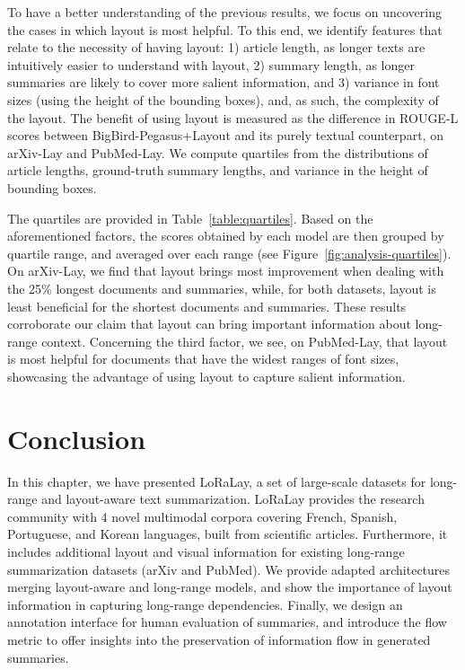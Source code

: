 To have a better understanding of the previous results, we focus on uncovering the cases in which layout is most helpful. To this end, we identify features that relate to the necessity of having layout: 1) article length, as longer texts are intuitively easier to understand with layout, 2) summary length, as longer summaries are likely to cover more salient information, and 3) variance in font sizes (using the height of the bounding boxes), and, as such, the complexity of the layout.
The benefit of using layout is measured as the difference in ROUGE-L scores between BigBird-Pegasus+Layout and its purely textual counterpart, on arXiv-Lay and PubMed-Lay. We compute quartiles from the distributions of article lengths, ground-truth summary lengths, and variance in the height of bounding boxes. 

The quartiles are provided in Table~\ref{table:quartiles}. Based on the aforementioned factors, the scores obtained by each model are then grouped by quartile range, and averaged over each range (see Figure~\ref{fig:analysis-quartiles}). On arXiv-Lay, we find that layout brings most improvement when dealing with the 25\% longest documents and summaries, while, for both datasets, layout is least beneficial for the shortest documents and summaries. These results corroborate our claim that layout can bring important information about long-range context. Concerning the third factor, we see, on PubMed-Lay, that layout is most helpful for documents that have the widest ranges of font sizes, showcasing the advantage of using layout to capture salient information. 

\section{Conclusion}

In this chapter, we have presented LoRaLay, a set of large-scale datasets for long-range and layout-aware text summarization. LoRaLay provides the research community with 4 novel multimodal corpora covering French, Spanish, Portuguese, and Korean languages, built from scientific articles. Furthermore, it includes additional layout and visual information for existing long-range summarization datasets (arXiv and PubMed). We provide adapted architectures merging layout-aware and long-range models, and show the importance of layout information in capturing long-range dependencies. Finally, we design an annotation interface for human evaluation of summaries, and introduce the flow metric to offer insights into the preservation of information flow in generated summaries.